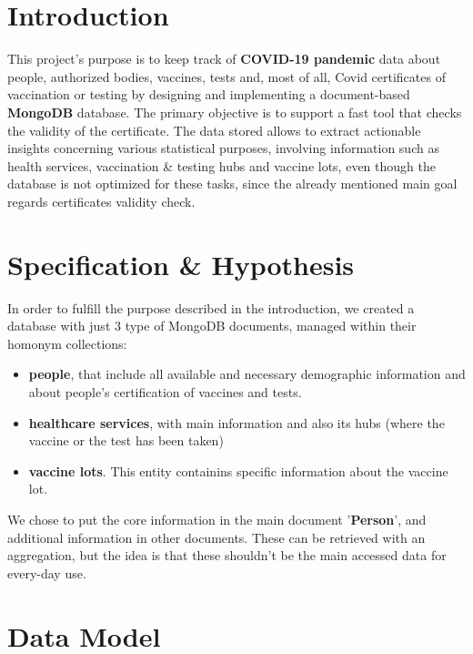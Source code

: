 \documentclass{article}[IEEEtran]
\begin{document}
\section{Introduction}\label{sec:intro}

This project's purpose is to keep track of \textbf{COVID-19 pandemic} data about people, authorized bodies, vaccines, tests and, most of all, Covid certificates of vaccination or testing by designing and implementing a document-based \textbf{MongoDB} database. The primary objective is to support a fast tool that checks the validity of the certificate. 
The data stored allows to extract actionable insights concerning various statistical purposes, involving information such as health services, vaccination \& testing hubs and vaccine lots, even though the database is not optimized for these tasks, since the already mentioned main goal regards certificates validity check.

\section{Specification \& Hypothesis}\label{sec:spec-hyp}

In order to fulfill the purpose described in the introduction, we created a database with just 3 type of MongoDB documents, managed within their homonym collections:
\begin{itemize}
\item \textbf{people}, that include all available and necessary demographic information and about people's certification of vaccines and tests.
\item \textbf{healthcare services}, with main information and also its hubs (where the vaccine or the test has been taken)
\item \textbf{vaccine lots}. This entity containins specific information about the vaccine lot.
\end{itemize}
We chose to put the core information in the main document '\textbf{Person}', and additional information in other documents. These can be retrieved with an aggregation, but the idea is that these shouldn't be the main accessed data for every-day use.

\section{Data Model}\label{sec:data}
\end{document}
